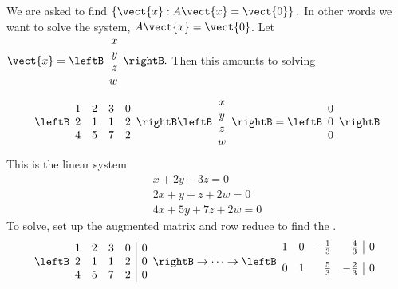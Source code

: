 \begin{solution}  We are asked to find $\left\{ \vect{x} : A\vect{x} = \vect{0}\right\} .$ In other
words we want to solve the system, $A\vect{x}=\vect{0}$. Let $\vect{x} =
\leftB
\begin{array}{r}
x \\
y \\
z \\
w
\end{array}
\rightB.$ Then this amounts to solving
\begin{equation*}
\leftB
\begin{array}{rrrr}
1 & 2 & 3 & 0 \\
2 & 1 & 1 & 2 \\
4 & 5 & 7 & 2
\end{array}
\rightB \leftB
\begin{array}{c}
x \\
y \\
z \\
w
\end{array}
\rightB =\leftB
\begin{array}{c}
0 \\
0 \\
0
\end{array}
\rightB
\end{equation*}
This is the linear system
\begin{equation*}
\begin{array}{c}
x+2y+3z=0 \\
2x+y+z+2w=0 \\
4x+5y+7z+2w=0
\end{array}
\end{equation*}
To solve, set up the augmented matrix and row reduce to find the {\rref}.
\begin{equation*}
\leftB
\begin{array}{rrrr|r}
1 & 2 & 3 & 0 & 0 \\
2 & 1 & 1 & 2 & 0 \\
4 & 5 & 7 & 2 & 0
\end{array}
\rightB
\rightarrow \cdots \rightarrow
\leftB
\begin{array}{rrrr|r}
1 & 0 & -
\vspace{0.05in}\frac{1}{3} & \vspace{0.05in}\frac{4}{3} &  0 \\
0 & 1 & \vspace{0.05in}\frac{5}{3} & -\vspace{0.05in}\frac{2}{3} & 0 \\

\end{array}
\end{equation*}
\end{solution}
